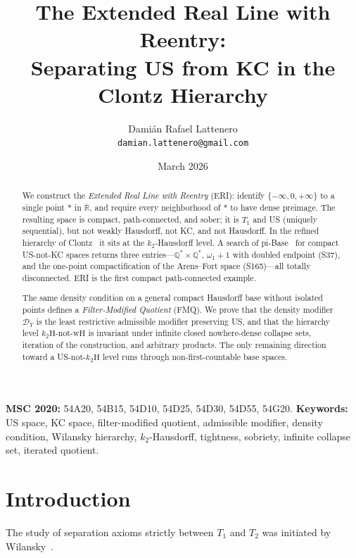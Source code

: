 \documentclass[11pt]{article}
\title{The Extended Real Line with Reentry:\\
Separating US from KC in the Clontz Hierarchy}
\author{Dami\'{a}n Rafael Lattenero\\[4pt]
\small\texttt{damian.lattenero@gmail.com}}
\date{March 2026}
\theoremstyle{definition}
\theoremstyle{remark}
\begin{document}
\maketitle

\begin{abstract}
We construct the \emph{Extended Real Line with Reentry} (ERI):
identify $\{-\infty, 0, +\infty\}$ to a single point $\ast$ in
$\overline{\mathbb{R}}$, and require every neighborhood of $\ast$ to
have dense preimage.
The resulting space is compact, path-connected, and sober; it is
$T_1$ and US (uniquely sequential), but not weakly Hausdorff, not
KC, and not Hausdorff.  In the refined hierarchy of
Clontz~\cite{bib:clontz} it sits at the $k_2$-Hausdorff level.
A search of pi-Base~\cite{bib:pibase} for compact US-not-KC spaces
returns three entries---$\mathbb{Q}^{\ast} \times \mathbb{Q}^{\ast}$,
$\omega_1{+}1$ with doubled endpoint (S37), and the one-point
compactification of the Arens--Fort space (S165)---all totally
disconnected.  ERI is the first compact path-connected example.

The same density condition on a general compact Hausdorff base
without isolated points defines a \emph{Filter-Modified Quotient}
(FMQ).  We prove that the density modifier $\mathcal{D}_Y$ is the
least restrictive admissible modifier preserving US, and that the
hierarchy level $k_2\mathrm{H}$-not-$\mathrm{wH}$ is invariant under
infinite closed nowhere-dense collapse sets, iteration of the
construction, and arbitrary products.  The only remaining direction
toward a US-not-$k_2\mathrm{H}$ level runs through non-first-countable
base spaces.
\end{abstract}

\smallskip
\noindent\textbf{MSC 2020:} 54A20, 54B15, 54D10, 54D25, 54D30, 54D55, 54G20.\quad
\textbf{Keywords:} US space, KC space, filter-modified quotient,
admissible modifier, density condition, Wilansky hierarchy,
$k_2$-Hausdorff, tightness, sobriety, infinite collapse set,
iterated quotient.

\tableofcontents

\section{Introduction}\label{sec:intro}

The study of separation axioms strictly between $T_1$ and $T_2$ was
initiated by Wilansky~\cite{bib:wilansky}.
\end{document}

